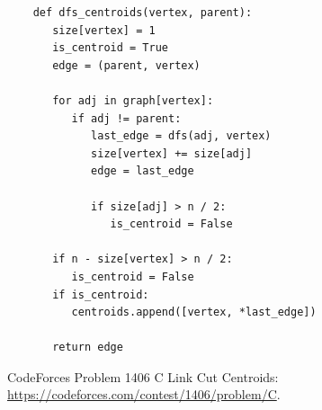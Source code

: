 \documentclass[runningheads,a4paper]{llncs}
\begin{document}
\begin{center}
	\begin{lstlisting}
	def dfs_centroids(vertex, parent):
	   size[vertex] = 1
	   is_centroid = True
	   edge = (parent, vertex)
	
	   for adj in graph[vertex]:
	      if adj != parent:
	         last_edge = dfs(adj, vertex)
	         size[vertex] += size[adj]
	         edge = last_edge
	
	         if size[adj] > n / 2:
	            is_centroid = False
	
	   if n - size[vertex] > n / 2:
	      is_centroid = False
	   if is_centroid:
	      centroids.append([vertex, *last_edge])
	
	   return edge
	\end{lstlisting}
\end{center} 

\begin{thebibliography}{99}
	 CodeForces Problem 1406 C Link Cut Centroids: \href{https://codeforces.com/contest/1406/problem/C}
	{https://codeforces.com/contest/1406/problem/C}.
\end{thebibliography}
\end{document}
